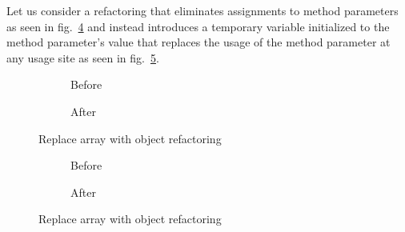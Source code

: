Let us consider a refactoring that eliminates assignments to method parameters as seen in fig.~\ref{refa:RemoveAssignment-before} and instead introduces a temporary variable initialized to the method parameter's value that replaces the usage of the method parameter at any usage site as seen in fig.~\ref{refa:RemoveAssignment-after}.

\begin{figure}
  \begin{subfigure}[h]{.45\linewidth}
    
    \caption{Before}
    \label{refa:RemoveAssignment-before}    
  \end{subfigure}\hspace{1cm}
  \begin{subfigure}[h]{.45\linewidth}
    
    \caption{After}
    \label{refa:RemoveAssignment-after}
  \end{subfigure}
  \caption{Replace array with object refactoring}
  \label{refa:RemovAssignment}
\end{figure}


\begin{figure}
  \begin{subfigure}[h]{.45\linewidth}
    
    \caption{Before}
    \label{refa:RemoveAssignment-before}    
  \end{subfigure}\hspace{1cm}
  \begin{subfigure}[h]{.45\linewidth}
    
    \caption{After}
    \label{refa:RemoveAssignment-after}
  \end{subfigure}
  \caption{Replace array with object refactoring}
  \label{refa:RemovAssignment}
\end{figure}
